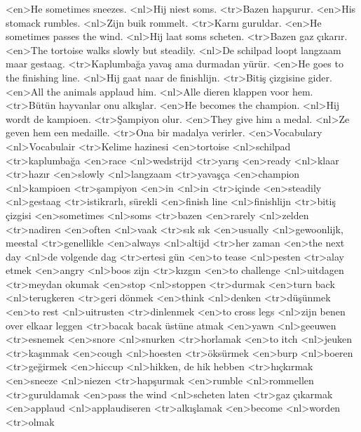 <en>He sometimes sneezes.
<nl>Hij niest soms.
<tr>Bazen hapşurur.
<en>His stomack rumbles.
<nl>Zijn buik rommelt.
<tr>Karnı guruldar.
<en>He sometimes passes the wind.
<nl>Hij laat soms scheten.
<tr>Bazen gaz çıkarır.
<en>The tortoise walks slowly but steadily.
<nl>De schilpad loopt langzaam maar gestaag.
<tr>Kaplumbağa yavaş ama durmadan yürür.
<en>He goes to the  finishing line.
<nl>Hij gaat naar de finishlijn.
<tr>Bitiş çizgisine gider.
<en>All the animals applaud him.
<nl>Alle dieren klappen voor hem.
<tr>Bütün hayvanlar onu alkışlar.
<en>He becomes the champion.
<nl>Hij wordt de kampioen.
<tr>Şampiyon olur.
<en>They give him a medal.
<nl>Ze geven hem een medaille.
<tr>Ona bir madalya verirler.
<en>Vocabulary
<nl>Vocabulair
<tr>Kelime hazinesi
<en>tortoise
<nl>schilpad
<tr>kaplumbağa
<en>race
<nl>wedstrijd
<tr>yarış
<en>ready
<nl>klaar
<tr>hazır
<en>slowly
<nl>langzaam
<tr>yavaşça
<en>champion
<nl>kampioen
<tr>şampiyon
<en>in
<nl>in
<tr>içinde
<en>steadily
<nl>gestaag
<tr>istikrarlı, sürekli
<en>finish line
<nl>finishlijn
<tr>bitiş çizgisi
<en>sometimes
<nl>soms
<tr>bazen
<en>rarely
<nl>zelden
<tr>nadiren
<en>often
<nl>vaak
<tr>sık sık
<en>usually
<nl>gewoonlijk, meestal
<tr>genellikle
<en>always
<nl>altijd
<tr>her zaman
<en>the next day
<nl>de volgende dag
<tr>ertesi gün
<en>to tease
<nl>pesten
<tr>alay etmek
<en>angry
<nl>boos zijn 
<tr>kızgın
<en>to challenge
<nl>uitdagen
<tr>meydan okumak
<en>stop
<nl>stoppen
<tr>durmak
<en>turn back
<nl>terugkeren
<tr>geri dönmek
<en>think
<nl>denken
<tr>düşünmek
<en>to rest
<nl>uitrusten
<tr>dinlenmek
<en>to cross legs
<nl>zijn benen over elkaar leggen
<tr>bacak bacak üstüne atmak
<en>yawn
<nl>geeuwen
<tr>esnemek
<en>snore
<nl>snurken
<tr>horlamak
<en>to itch
<nl>jeuken
<tr>kaşınmak
<en>cough
<nl>hoesten
<tr>öksürmek
<en>burp
<nl>boeren
<tr>geğirmek
<en>hiccup
<nl>hikken, de hik hebben
<tr>hıçkırmak
<en>sneeze
<nl>niezen
<tr>hapşurmak
<en>rumble
<nl>rommellen
<tr>guruldamak
<en>pass the wind
<nl>scheten laten
<tr>gaz çıkarmak
<en>applaud
<nl>applaudiseren
<tr>alkışlamak
<en>become
<nl>worden
<tr>olmak
